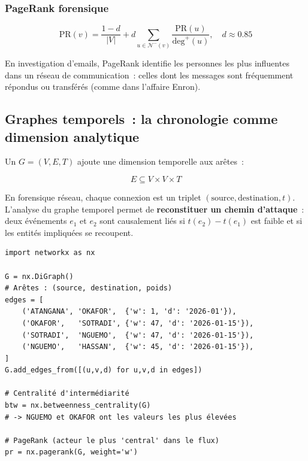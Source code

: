 \subsubsection{PageRank forensique}

\begin{equation}
\mathrm{PR}(v) = \frac{1-d}{|V|} + d \sum_{u \in \mathcal{N}^{-}(v)}
\frac{\mathrm{PR}(u)}{\mathrm{deg}^+(u)}, \quad d \approx 0.85
\label{eq:pagerank}
\end{equation}

En investigation d'emails, PageRank identifie les personnes les plus influentes
dans un réseau de communication~: celles dont les messages sont fréquemment
répondus ou transférés (comme dans l'affaire Enron).

\subsection{Graphes temporels~: la chronologie comme dimension analytique}

Un  $G = (V, E, T)$ ajoute
une dimension temporelle aux arêtes~:

\begin{equation}
E \subseteq V \times V \times T
\label{eq:graphe-temporel}
\end{equation}

En forensique réseau, chaque connexion est un triplet
$(\text{source}, \text{destination}, t)$. L'analyse du graphe temporel
permet de \textbf{reconstituer un chemin d'attaque}~: deux événements $e_1$
et $e_2$ sont causalement liés si $t(e_2) - t(e_1)$ est faible et si les
entités impliquées se recoupent.

\begin{lstlisting}[language=bash_forensique,
    caption={Analyse de graphe criminel avec NetworkX}]
import networkx as nx

G = nx.DiGraph()
# Arêtes : (source, destination, poids)
edges = [
    ('ATANGANA', 'OKAFOR',  {'w': 1, 'd': '2026-01'}),
    ('OKAFOR',   'SOTRADI', {'w': 47, 'd': '2026-01-15'}),
    ('SOTRADI',  'NGUEMO',  {'w': 47, 'd': '2026-01-15'}),
    ('NGUEMO',   'HASSAN',  {'w': 45, 'd': '2026-01-15'}),
]
G.add_edges_from([(u,v,d) for u,v,d in edges])

# Centralité d'intermédiarité
btw = nx.betweenness_centrality(G)
# -> NGUEMO et OKAFOR ont les valeurs les plus élevées

# PageRank (acteur le plus 'central' dans le flux)
pr = nx.pagerank(G, weight='w')
\end{lstlisting}

